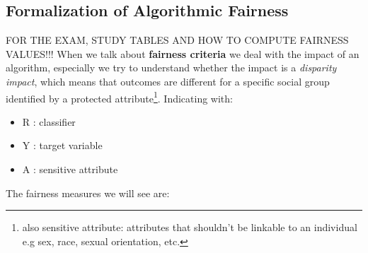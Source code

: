 \subsection{Formalization of Algorithmic Fairness}
FOR THE EXAM, STUDY TABLES AND HOW TO COMPUTE FAIRNESS VALUES!!!
When we talk about \textbf{fairness criteria} we deal with the impact of an algorithm, especially we try to understand whether the impact is a \textit{disparity impact}, which means that outcomes are different for a specific social group identified by a protected attribute\footnote{also sensitive attribute: attributes that shouldn't be linkable to an individual e.g sex, race, sexual orientation, etc.}.
Indicating with:
\begin{itemize}
    \item R : classifier 
    \item Y : target variable
    \item A : sensitive attribute
\end{itemize}
The fairness measures we will see are:

